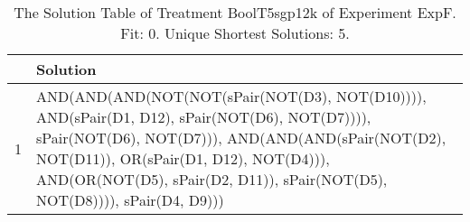 \begin{table}[ht]
\centering
\begin{tabular}{rp{9cm}}
  \hline
 & Solution \\ 
  \hline
1 & AND(AND(AND(NOT(NOT(sPair(NOT(D3), NOT(D10)))), AND(sPair(D1, D12), sPair(NOT(D6), NOT(D7)))), sPair(NOT(D6), NOT(D7))), AND(AND(AND(sPair(NOT(D2), NOT(D11)), OR(sPair(D1, D12), NOT(D4))), AND(OR(NOT(D5), sPair(D2, D11)), sPair(NOT(D5), NOT(D8)))), sPair(D4, D9))) \\ 
   \hline
\end{tabular}
\caption{The Solution Table of Treatment BoolT5sgp12k of Experiment ExpF. Fit: 0. Unique Shortest Solutions: 5.} 
\end{table}

